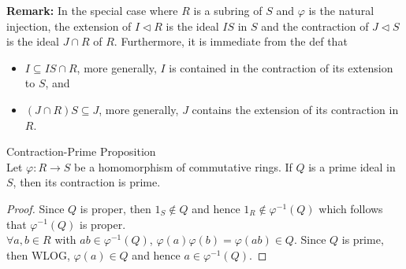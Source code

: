 \noindent\textbf{Remark:} In the special case where $R$ is a subring of $S$ and $\varphi$ is the natural injection, the extension of $I \triangleleft R$ is the ideal $IS$ in $S$ and the contraction of $J\triangleleft S$ is the ideal $J \cap R$ of $R$. Furthermore, it is immediate from the def that
\begin{itemize}
    \item $I \subseteq IS\cap R$, more generally, $I$ is contained in the contraction of its extension to $S$, and
    \item $(J \cap R)S \subseteq J$, more generally, $J$ contains the extension of its contraction in $R$.
\end{itemize}

\begin{proposition}{Contraction-Prime Proposition}\\
Let $\varphi:R \to S$ be a homomorphism of commutative rings. If $Q$ is a prime ideal in $S$, then its contraction is prime.
\end{proposition}

\begin{proof}
    Since $Q$ is proper, then $1_S \notin Q$ and hence $1_R \notin \varphi^{-1}(Q)$ which follows that $\varphi^{-1} (Q)$ is proper.\\
    $\forall a,b \in R$ with $ab \in \varphi^{-1}(Q)$, $\varphi(a) \varphi (b) =\varphi(ab) \in Q$. Since $Q$ is prime, then WLOG, $\varphi(a) \in Q$ and hence $a \in \varphi^{-1}(Q)$.
\end{proof}

